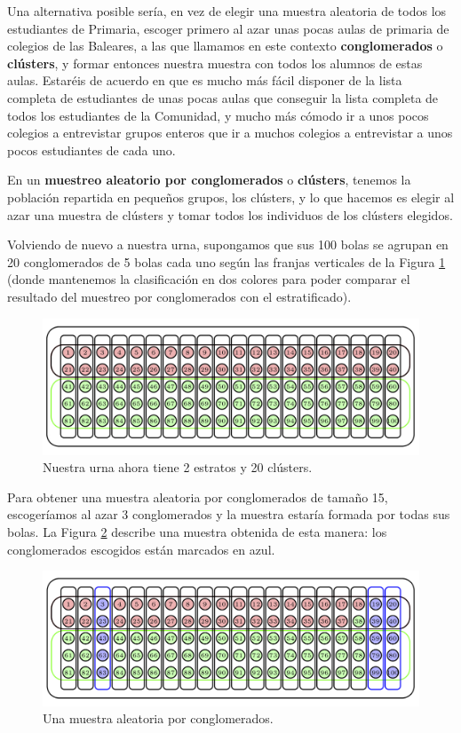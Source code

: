 \documentclass[
]{book}
\theoremstyle{definition}
\theoremstyle{definition}
\theoremstyle{definition}
\theoremstyle{definition}
\theoremstyle{remark}
\begin{document}
Una alternativa posible sería, en vez de elegir una muestra aleatoria de todos los estudiantes de Primaria, escoger primero al azar unas pocas aulas de primaria de colegios de las Baleares, a las que llamamos en este contexto \textbf{conglomerados} o \textbf{clústers}, y formar entonces nuestra muestra con todos los alumnos de estas aulas. Estaréis de acuerdo en que es mucho más fácil disponer de la lista completa de estudiantes de unas pocas aulas que conseguir la lista completa de todos los estudiantes de la Comunidad, y mucho más cómodo ir a unos pocos colegios a entrevistar grupos enteros que ir a muchos colegios a entrevistar a unos pocos estudiantes de cada uno.

En un \textbf{muestreo aleatorio por conglomerados} o \textbf{clústers}, tenemos la población repartida en pequeños grupos, los clústers, y lo que hacemos es elegir al azar una muestra de clústers y tomar todos los individuos de los clústers elegidos.

Volviendo de nuevo a nuestra urna, supongamos que sus 100 bolas se agrupan en 20 conglomerados de 5 bolas cada uno según las franjas verticales de la Figura \ref{fig:clustprevi} (donde mantenemos la clasificación en dos colores para poder comparar el resultado del muestreo por conglomerados con el estratificado).

\begin{figure}

{\centering \includegraphics[width=0.8\linewidth]{INREMDN_files/figure-html/clusterprevi} 

}

\caption{Nuestra urna ahora tiene 2 estratos y 20 clústers.}\label{fig:clustprevi}
\end{figure}

Para obtener una muestra aleatoria por conglomerados de tamaño 15, escogeríamos al azar 3 conglomerados y la muestra estaría formada por todas sus bolas. La Figura \ref{fig:clust} describe una muestra obtenida de esta manera: los conglomerados escogidos están marcados en azul.

\begin{figure}

{\centering \includegraphics[width=0.8\linewidth]{INREMDN_files/figure-html/cluster} 

}

\caption{Una muestra aleatoria por conglomerados.}\label{fig:clust}
\end{figure}
\end{document}
